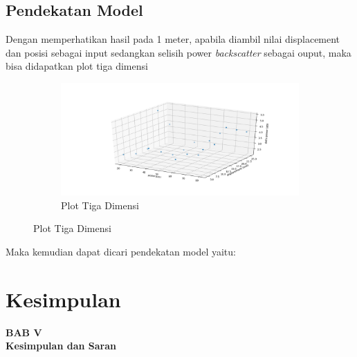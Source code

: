 \documentclass[12pt]{article}
\begin{document}
\newpage
	\subsection{Pendekatan Model}
	
	Dengan memperhatikan hasil pada 1 meter, apabila diambil nilai displacement dan posisi sebagai input sedangkan selisih power \textit{backscatter} sebagai ouput,
	maka bisa didapatkan plot tiga dimensi
	
	\begin{figure}[!h]
		\centering
		\captionsetup{justification=centering}
		\begin{subfigure}[h]{\textwidth}
			\includegraphics[width=\textwidth]{images/Bab_4/analisa_3D}	
			\caption{\small{Plot Tiga Dimensi}}		
		\end{subfigure}
	\end{figure}

	Maka kemudian dapat dicari pendekatan model yaitu:
	


\newpage
\thispagestyle{empty}
\mbox{}


\newpage
\thispagestyle{empty}
\mbox{}



\newpage
\section{Kesimpulan}

\begin{center}
	{\large \textbf{BAB V}} \\
	{\large \textbf{Kesimpulan dan Saran}}
\end{center}
\end{document}
